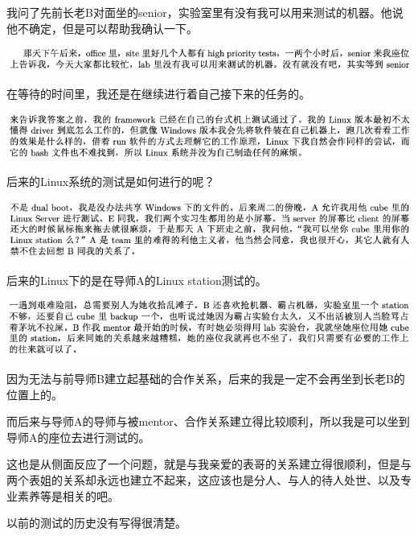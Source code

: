 \documentclass[9pt, b5paper]{article}
\begin{document}
我问了先前长老B对面坐的senior，实验室里有没有我可以用来测试的机器。他说他不确定，但是可以帮助我确认一下。 

\begin{center}
\includegraphics[width=.9\linewidth]{./pic/backups_plans_20210514_115922.png}
\end{center}

在等待的时间里，我还是在继续进行着自己接下来的任务的。 

\begin{center}
\includegraphics[width=.9\linewidth]{./pic/backups_plans_20210514_120100.png}
\end{center}

后来的Linux系统的测试是如何进行的呢？

\begin{center}
\includegraphics[width=.9\linewidth]{./pic/backups_plans_20210514_120348.png}
\end{center}

后来的Linux下的是在导师A的Linux station测试的。

\begin{center}
\includegraphics[width=.9\linewidth]{./pic/backups_plans_20210514_120603.png}
\end{center}

因为无法与前导师B建立起基础的合作关系，后来的我是一定不会再坐到长老B的位置上的。 

而后来与导师A的导师与被mentor、合作关系建立得比较顺利，所以我是可以坐到导师A的座位去进行测试的。

这也是从侧面反应了一个问题，就是与我亲爱的表哥的关系建立得很顺利，但是与两个表姐的关系却永远也建立不起来，这应该也是分人、与人的待人处世、以及专业素养等是相关的吧。 

以前的测试的历史没有写得很清楚。 
\end{document}
